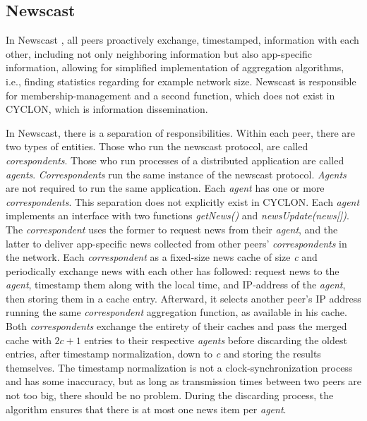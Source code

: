 \documentclass[runningheads]{llncs}
\begin{document}
\newpage\subsection{Newscast}
In Newscast \cite{newscast-computing}, all peers proactively exchange, timestamped, information with each other, including not only neighboring information but also app-specific information, allowing for simplified implementation of aggregation algorithms, i.e., finding statistics regarding for example network size. Newscast is responsible for membership-management and a second function, which does not exist in CYCLON, which is information dissemination.

In Newscast, there is a separation of responsibilities. Within each peer, there are two types of entities. Those who run the newscast protocol, are called \textit{corespondents}. Those who run processes of a distributed application are called \textit{agents}. \textit{Correspondents} run the same instance of the newscast protocol. \textit{Agents} are not required to run the same application. Each \textit{agent} has one or more \textit{correspondents}. This separation does not explicitly exist in CYCLON. Each \textit{agent} implements an interface with two functions \textit{getNews()} and \textit{newsUpdate(news[])}. The \textit{correspondent} uses the former to request news from their \textit{agent}, and the latter to deliver app-specific news collected from other peers' \textit{correspondents} in the network. Each \textit{correspondent} as a fixed-size news cache of size \textit{c} and periodically exchange news with each other has followed: request news to the \textit{agent}, timestamp them along with the local time, and IP-address of the \textit{agent}, then storing them in a cache entry. Afterward, it selects another peer's IP address running the same \textit{correspondent} aggregation function, as available in his cache. Both \textit{correspondents} exchange the entirety of their caches and pass the merged cache with $2c+1$ entries to their respective \textit{agents} before discarding the oldest entries, after timestamp normalization, down to \textit{c} and storing the results themselves. The timestamp normalization is not a clock-synchronization process and has some inaccuracy, but as long as transmission times between two peers are not too big, there should be no problem. During the discarding process, the algorithm ensures that there is at most one news item per \textit{agent}.
\end{document}
